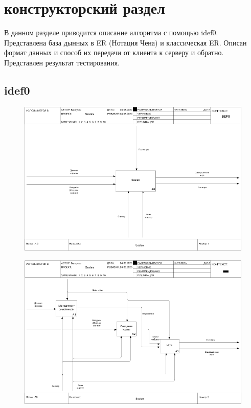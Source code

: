 \newpage
\section{конструкторский раздел}
	
	В данном разделе приводится описание алгоритма с помощью idef0. Представлена база дынных в ER (Нотация Чена) и классическая ER. Описан формат данных и способ их передачи от клиента к серверу и обратно. Представлен результат тестирования.
	
\subsection{idef0}
	
	\begin{figure}[H]
		\centering
		\includegraphics[width=0.7\linewidth]{src/Idef0/01_A-0}
		\caption{}
		\label{fig:01a-0}
	\end{figure}
	
	\begin{figure}[H]
		\centering
		\includegraphics[width=0.7\linewidth]{src/Idef0/02_A0}
		\caption{}
		\label{fig:02a0}
	\end{figure}
	
